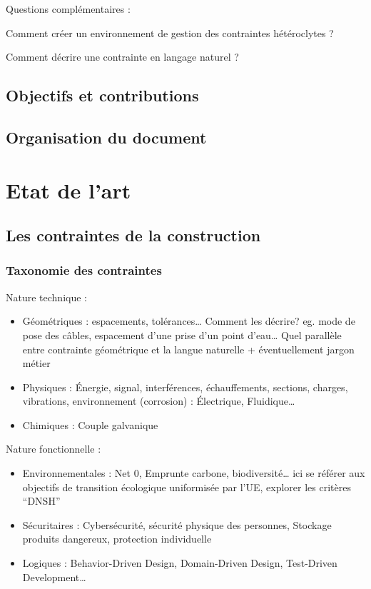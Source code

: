 \documentclass[a4paper,12pt]{article}
\begin{document}
Questions complémentaires :

Comment créer un environnement de gestion des contraintes hétéroclytes ?

Comment décrire une contrainte en langage naturel ?
\subsection{Objectifs et contributions}
\label{sec:orgabaf4ca}

\subsection{Organisation du document}
\label{sec:org6c47372}
\clearpage
\section{Etat de l'art}
\label{sec:orgcabc623}
\subsection{Les contraintes de la construction}
\label{sec:org20f4862}
\subsubsection{Taxonomie des contraintes}
\label{sec:orgb9f9df7}
Nature technique :
\begin{itemize}
\item Géométriques : espacements, tolérances…
Comment les décrire? eg. mode de pose des câbles, espacement d’une prise d’un point d’eau…
Quel parallèle entre contrainte géométrique et la langue naturelle + éventuellement jargon métier
\item Physiques : Énergie, signal, interférences, échauffements, sections, charges, vibrations, environnement (corrosion) : Électrique, Fluidique…
\item Chimiques : Couple galvanique
\end{itemize}

Nature fonctionnelle :
\begin{itemize}
\item Environnementales : Net 0, Emprunte carbone, biodiversité… ici se référer aux objectifs de transition écologique uniformisée par l’UE, explorer les critères “DNSH”
\item Sécuritaires : Cybersécurité, sécurité physique des personnes, Stockage produits dangereux, protection individuelle
\item Logiques : Behavior-Driven Design, Domain-Driven Design, Test-Driven Development\ldots{}
\end{itemize}
\end{document}
